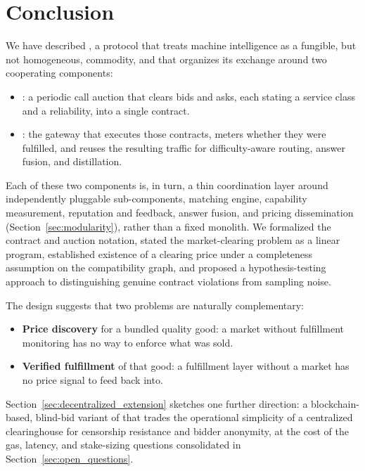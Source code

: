 \section{Conclusion}
\label{sec:conclusion}

We have described \Noesis, a protocol that treats machine intelligence as
a fungible, but not homogeneous, commodity, and that organizes its
exchange around two cooperating components:

\begin{itemize}
  \item \textbf{\NoesisMarket}: a periodic call auction that clears bids and
    asks, each stating a service class and a reliability, into a single
    contract.
  \item \textbf{\NoesisServer}: the gateway that executes those contracts,
    meters whether they were fulfilled, and reuses the resulting traffic for
    difficulty-aware routing, answer fusion, and distillation.
\end{itemize}

Each of these two components is, in turn, a thin
coordination layer around independently pluggable sub-components, matching
engine, capability measurement, reputation and feedback, answer fusion, and
pricing dissemination (Section~\ref{sec:modularity}), rather than a fixed
monolith. We formalized the contract and auction notation, stated the
market-clearing problem as a linear program, established existence of a
clearing price under a completeness assumption on the compatibility
graph, and proposed a hypothesis-testing approach to distinguishing
genuine contract violations from sampling noise.

The design suggests that two problems are naturally complementary:

\begin{itemize}
  \item \textbf{Price discovery} for a bundled quality good: a market without
    fulfillment monitoring has no way to enforce what was sold.
  \item \textbf{Verified fulfillment} of that good: a fulfillment layer
    without a market has no price signal to feed back into.
\end{itemize}

Section~\ref{sec:decentralized_extension}
sketches one further direction: a blockchain-based, blind-bid variant of
\NoesisMarket{} that trades the operational simplicity of a centralized
clearinghouse for censorship resistance and bidder anonymity, at the cost
of the gas, latency, and stake-sizing questions consolidated in
Section~\ref{sec:open_questions}.

